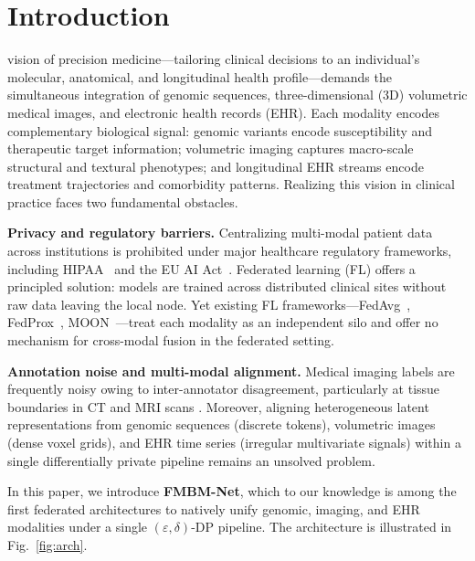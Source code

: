 \documentclass{ieeeaccess}
\begin{document}
\titlepgskip=-21pt
\maketitle

\section{Introduction}
\label{sec:introduction}

 vision of precision medicine---tailoring clinical decisions
to an individual's molecular, anatomical, and longitudinal health
profile---demands the simultaneous integration of genomic sequences,
three-dimensional (3D) volumetric medical images, and electronic health
records (EHR). Each modality encodes complementary biological signal:
genomic variants encode susceptibility and therapeutic target information;
volumetric imaging captures macro-scale structural and textural phenotypes;
and longitudinal EHR streams encode treatment trajectories and comorbidity
patterns. Realizing this vision in clinical practice faces two fundamental
obstacles.

\textbf{Privacy and regulatory barriers.} Centralizing multi-modal patient
data across institutions is prohibited under major healthcare regulatory
frameworks, including HIPAA~\cite{hipaa_guidance_2024} and the EU AI
Act~\cite{eu_ai_act_2024}. Federated learning (FL) offers a principled
solution: models are trained across distributed clinical sites without raw
data leaving the local node. Yet existing FL frameworks---FedAvg~\cite{mcmahan2017},
FedProx~\cite{li2020fedprox}, MOON~\cite{li2021moon}---treat each modality
as an independent silo and offer no mechanism for cross-modal fusion in the
federated setting.

\textbf{Annotation noise and multi-modal alignment.} Medical imaging labels
are frequently noisy owing to inter-annotator disagreement, particularly at
tissue boundaries in CT and MRI scans \cite{rue_ct_2025}. Moreover, aligning
heterogeneous latent representations from genomic sequences (discrete tokens),
volumetric images (dense voxel grids), and EHR time series (irregular
multivariate signals) within a single differentially private pipeline remains
an unsolved problem.

In this paper, we introduce \textbf{FMBM-Net}, which to our knowledge is
among the first federated architectures to natively unify genomic, imaging,
and EHR modalities under a single $(\varepsilon,\delta)$-DP pipeline. The
architecture is illustrated in Fig.~\ref{fig:arch}.
\end{document}
